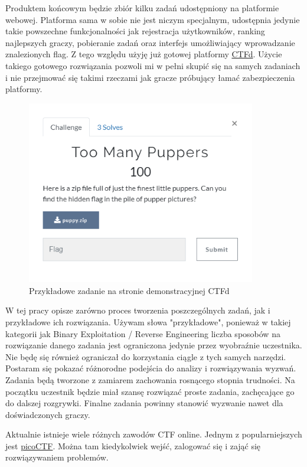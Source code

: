 \documentclass[polish,12pt]{aghthesis}
\begin{document}
Produktem końcowym będzie zbiór kilku zadań udostępniony na platformie webowej.
Platforma sama w sobie nie jest niczym specjalnym, udostępnia jedynie takie powszechne
funkcjonalności jak rejestracja użytkowników, ranking najlepszych graczy,
pobieranie zadań oraz interfejs umożliwiający wprowadzanie znalezionych
flag. Z tego względu użyję już gotowej platformy \href{https://ctfd.io}{CTFd}.
Użycie takiego gotowego rozwiązania pozwoli mi w pełni skupić się na samych zadaniach
i nie przejmować się takimi rzeczami jak gracze próbujący łamać zabezpieczenia
platformy.

\begin{figure}[h]
    \centering
    \includegraphics[width=10cm]{ctfd}
    \caption{Przykładowe zadanie na stronie demonstracyjnej CTFd}
    \label{fig:ctfd}
\end{figure}

W tej pracy opisze zarówno proces tworzenia poszczególnych zadań,
jak i przykładowe ich rozwiązania. Używam słowa "przykładowe", ponieważ
w takiej kategorii jak Binary Exploitation / Reverse Engineering liczba sposobów
na rozwiązanie danego zadania jest ograniczona jedynie przez wyobraźnie uczestnika.
Nie będę się również ograniczał do korzystania ciągle z tych samych narzędzi.
Postaram się pokazać różnorodne podejścia do analizy i rozwiązywania wyzwań.
Zadania będą tworzone z zamiarem zachowania rosnącego stopnia trudności.
Na początku uczestnik będzie miał szansę rozwiązać proste zadania,
zachęcające go do dalszej rozgrywki. Finalne zadania powinny stanowić wyzwanie
nawet dla doświadczonych graczy. \pagebreak

Aktualnie istnieje wiele różnych zawodów CTF online.
Jednym z popularniejszych jest \newline \href{https://picoctf.com}{picoCTF}.
Można tam kiedykolwiek wejść, zalogować się i zająć się rozwiązywaniem problemów.
\end{document}

